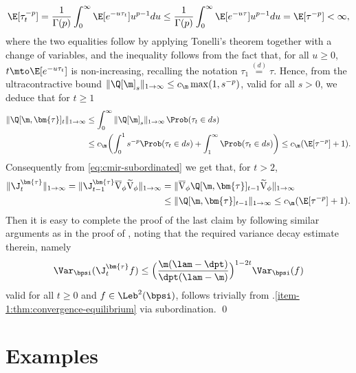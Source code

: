 \begin{equation*}
\E[\tau_t^{-p}] = \frac{1}{\Gamma(p)} \int_0^\infty \E[e^{-u \tau_t}] u^{p-1} du \leq \frac{1}{\Gamma(p)} \int_0^\infty \E[e^{-u \tau}] u^{p-1} du = \E[\tau^{-p}] < \infty,
\end{equation*}
where the two equalities follow by applying Tonelli's theorem together with a change of variables, and the inequality follows from the fact that, for all $u\geq0$, $t \mto \E[e^{-u \tau_t}]$ is non-increasing, recalling the notation $\tau_1\stackrel{(d)}{=}\tau$. Hence, from the ultracontractive bound $\|\Q[\m]_s\|_{1 \to \infty} \leq c_\m \max(1,s^{-p})$, valid for all $s > 0$, we deduce that for $t \geq 1$
\begin{align*}
\|\Q[\m,\bm{\tau}]_t\|_{1 \to \infty} &\leq \int_0^\infty \|\Q[\m]_s\|_{1 \to \infty}\, \Prob(\tau_t \in ds)\\
&\leq c_\m \biggl(\int_0^1 s^{-p} \Prob(\tau_t \in ds) + \int_1^\infty \Prob(\tau_t \in ds)  \biggr) \leq c_\m(\E[\tau^{-p}]+1).
\end{align*}
Consequently from \eqref{eq:cmir-subordinated} we get that, for $t > 2$,
\begin{align*}
\|\J_t^{\bm{\tau}}\|_{1\to\infty} = \|\J_{t-1}^{\bm{\tau}} \overline{\mathrm{V}}_\phi \widetilde{\mathrm{V}}_\phi\|_{1\to\infty} &= \|\overline{\mathrm{V}}_\phi \Q[\m,\bm{\tau}]_{t-1} \widetilde{\mathrm{V}}_\phi\|_{1\to\infty}\\
&\leq \|\Q[\m,\bm{\tau}]_{t-1}\|_{1 \to \infty} \leq c_\m(\E[\tau^{-p}]+1).
\end{align*}
Then it is easy to complete the proof of the last claim by following similar arguments as in the proof of \cite[Prop.\,6.3.4]{Bakry_Book}, noting that the required variance decay estimate therein, namely
\begin{equation*}
\Var_\bpsi(\J_t^{\bm{\tau}} f) \leq \Bigl(\frac{\m(\lam-\dpt)}{\dpt(\lam-\m)}\Bigr)^{1-2t} \Var_\bpsi(f)
\end{equation*}
valid for all $t \geq 0$ and $f \in \Leb^2(\bpsi)$, follows trivially from .\eqref{item-1:thm:convergence-equilibrium} via subordination. \qed

\section{Examples} \label{sec:examples}

